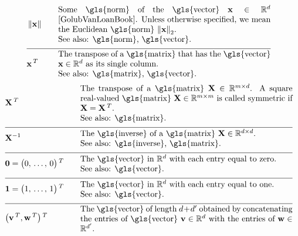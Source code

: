 \begin{align}
	&\normgeneric{\featurevec}{}  & \quad &  \parbox{.75\textwidth}{Some \gls{norm} of the \gls{vector} $\featurevec \in \mathbb{R}^{\featuredim}$ \cite{GolubVanLoanBook}. 
		Unless otherwise specified, we mean the Euclidean \gls{norm} $\normgeneric{\featurevec}{2}$.
		\\ See also: \gls{norm}, \gls{vector}. } \nonumber \\[2mm] \hline \nonumber\\[-5mm]
	&\featurevec\,^{T} &\quad & \parbox{.75\textwidth}{The transpose of a \gls{matrix} that has the \gls{vector} 
		$\featurevec \in \mathbb{R}^{\dimlocalmodel}$ as its single column.
		\\ See also: \gls{matrix}, \gls{vector}. } \nonumber 
\end{align} 
\newpage
\begin{align} 
	&\mathbf{X}\,^{T} &\quad & \parbox{.75\textwidth}{The transpose of a \gls{matrix} $\mathbf{X} \in \mathbb{R}^{\samplesize \times \featurelen}$. 
		A square real-valued \gls{matrix} $\mathbf{X} \in \mathbb{R}^{\samplesize \times \samplesize}$ 
		is called symmetric if $\mathbf{X} = \mathbf{X}\,^{T}$. 
		\\ See also: \gls{matrix}. }  \nonumber \\[2mm] \hline \nonumber\\[-5mm]
	&\mathbf{X}^{-1} &\quad & \parbox{.75\textwidth}{The \gls{inverse} of a \gls{matrix} $\mathbf{X} \in \mathbb{R}^{\featurelen \times \featurelen}$.
		\\ See also: \gls{inverse}, \gls{matrix}. }  \nonumber \\[2mm] \hline \nonumber\\[-5mm]
	&\mathbf{0}= \big(0, \,\ldots, \,0\big)\,^{T}  & \quad &  \parbox{.75\textwidth}{The \gls{vector} in $\mathbb{R}^{\dimlocalmodel}$ with each entry equal to zero.
		\\ See also: \gls{vector}. } \nonumber \\[2mm] \hline \nonumber\\[-5mm]
	&\mathbf{1}= \big(1, \,\ldots, \,1\big)\,^{T}  & \quad &  \parbox{.75\textwidth}{The \gls{vector} in $\mathbb{R}^{\dimlocalmodel}$ with each entry equal to one.
		\\ See also: \gls{vector}. } \nonumber \\[2mm] \hline \nonumber\\[-5mm]
	&\big(\vv\,^{T},\vw\,^{T} \big)\,^{T}  & \quad &  \parbox{.75\textwidth}{The \gls{vector} of length $\featurelen+\featurelen'$ 
		obtained by concatenating the entries of \gls{vector} $\vv \in \mathbb{R}^{\featurelen}$ with the entries of $\vw \in \mathbb{R}^{\featurelen'}$.
}
\end{align}
